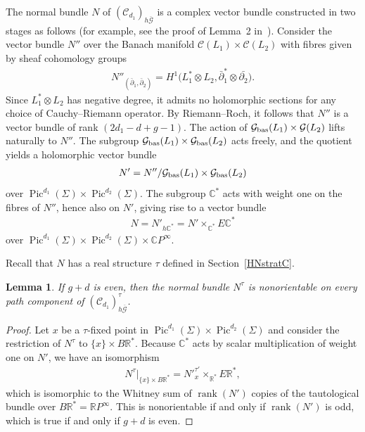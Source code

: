 \documentclass[10pt,a4paper]{amsart}
\numberwithin{equation}{section}
\newtheorem{Lemma}[Theorem]{Lemma}
\begin{document}
The normal bundle $N$ of $({\mathcal C}_{d_1})_{h\overline{{\mathcal G}}}$ is a complex vector bundle constructed in two stages as follows (for example, see the proof of Lemma~2 in~\cite{K}). Consider the vector bundle $N''$ over the Banach manifold ${\mathcal C}(L_1) \times {\mathcal C}(L_2)$ with f\/ibres given by sheaf cohomology groups \begin{gather*}N''_{(\bar{\partial}_1, \bar{\partial}_2)} = H^1\big( L_1^* \otimes L_2,\bar{\partial}_1^* \otimes \bar{\partial_2}\big). \end{gather*}
Since $L_1^* \otimes L_2$ has negative degree, it admits no holomorphic sections for any choice of Cauchy--Riemann operator. By Riemann--Roch, it follows that $N'' $ is a vector bundle of rank $(2d_1-d +g-1)$. The action of ${\mathcal G}_{\rm bas}(L_1) \times {\mathcal G}(L_2)$ lifts naturally to $N''$. The subgroup ${\mathcal G}_{\rm bas}(L_1) \times {\mathcal G}_{\rm bas}(L_2)$ acts freely, and the quotient yields a holomorphic vector bundle \begin{gather*}N' = N'' / {\mathcal G}_{\rm bas}(L_1) \times {\mathcal G}_{\rm bas}(L_2)\end{gather*} over $ \operatorname{Pic}^{d_1}(\Sigma) \times \operatorname{Pic}^{d_2}(\Sigma)$. The subgroup ${\mathbb C}^*$ acts with weight one on the f\/ibres of $N''$, hence also on $N'$, giving rise to a vector bundle \begin{gather*}N = N'_{h {\mathbb C}^*}= N' \times_{{\mathbb C}^*} E{\mathbb C}^*\end{gather*} over $\operatorname{Pic}^{d_1}(\Sigma) \times \operatorname{Pic}^{d_2}(\Sigma) \times {\mathbb C} P^{\infty}.$

Recall that $ N$ has a real structure $\tau$ def\/ined in Section~\ref{HNstratC}.

\begin{Lemma}\label{g+deven}
If $g+d$ is even, then the normal bundle $N^{\tau}$ is nonorientable on every path component of $({\mathcal C}_{d_1})_{h\overline{{\mathcal G}}}^{\tau}$.
\end{Lemma}

\begin{proof}
Let $x$ be a $\tau$-f\/ixed point in $\operatorname{Pic}^{d_1}(\Sigma) \times \operatorname{Pic}^{d_2}(\Sigma)$ and consider the restriction of $N^{\tau}$ to $\{x\} \times B {\mathbb R}^*$. Because ${\mathbb C}^*$ acts by scalar multiplication of weight one on $N'$, we have an isomorphism \begin{gather*}N^{\tau}|_{\{x\} \times B {\mathbb R}^*} = N'^{\tau'}_x \times_{{\mathbb R}^*} E {\mathbb R}^*, \end{gather*} which is isomorphic to the Whitney sum of $\operatorname{rank}(N')$ copies of the tautological bundle over $B {\mathbb R}^* = {\mathbb R} P^{\infty}$. This is nonorientable if and only if $\operatorname{rank}(N')$ is odd, which is true if and only if $g+d$ is even.
\end{proof}
\end{document}
